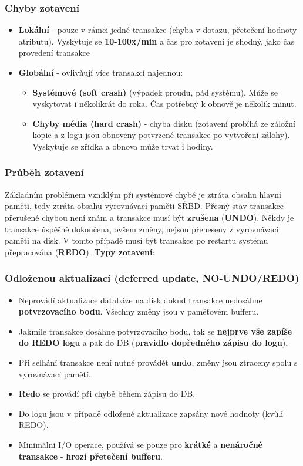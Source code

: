 \subsubsection{Chyby zotavení}
\begin{itemize}
\item\textbf{Lokální} - pouze v rámci jedné transakce (chyba v dotazu, přetečení hodnoty atributu). Vyskytuje se \textbf{10-100x/min} a čas pro zotavení je shodný, jako čas provedení transakce
\item\textbf{Globální} - ovlivňují více transakcí najednou:
\begin{itemize}
\item\textbf{Systémové (soft crash)} (výpadek proudu, pád systému). Může se vyskytovat i několikrát do roka. Čas potřebný k obnově je několik minut.
\item\textbf{Chyby média (hard crash)} - chyba disku (zotavení probíhá ze záložní kopie a z logu jsou obnoveny potvrzené transakce po vytvoření zálohy). Vyskytuje se zřídka a obnova může trvat i hodiny.
\end{itemize}
\end{itemize}

\subsubsection{Průběh zotavení}
Základním problémem vzniklým při systémové chybě je ztráta obsahu hlavní paměti, tedy ztráta obsahu vyrovnávací paměti SŘBD. Přesný stav transakce přerušené chybou není znám a transakce musí být \textbf{zrušena} (\textbf{UNDO}). Někdy je transakce úspěšně dokončena, ovšem změny, nejsou přeneseny z vyrovnávací paměti na disk. V tomto případě musí být transakce po restartu systému přepracována (\textbf{REDO}). \textbf{Typy zotavení}: 

\subsubsection*{Odloženou aktualizací (deferred update, NO-UNDO/REDO)}
\begin{itemize}
\item Neprovádí aktualizace databáze na disk dokud transakce nedosáhne\textbf{ potvrzovacího bodu}. Všechny změny jsou v paměťovém bufferu.
\item Jakmile transakce dosáhne potvrzovacího bodu, tak se \textbf{nejprve vše zapíše do REDO logu} a pak do DB (\textbf{pravidlo dopředného zápisu do logu}).
\item Při selhání transakce není nutné provádět \textbf{undo}, změny jsou ztraceny spolu s vyrovnávací pamětí.
\item \textbf{Redo} se provádí při chybě během zápisu do DB.
\item Do logu jsou v případě odložené aktualizace zapsány nové hodnoty (kvůli REDO).
\item Minimální I/O operace, používá se pouze pro \textbf{krátké} a \textbf{nenáročné transakce} - \textbf{hrozí přetečení bufferu}.
\end{itemize}
